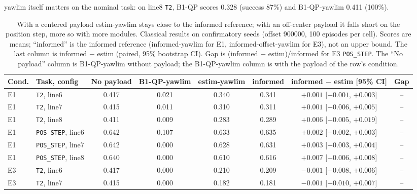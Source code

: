 \documentclass[conference]{IEEEtran}
\newcommand{\POS}{\texttt{POS\_STEP}}
\newcommand{\TT}{\texttt{T2}}
\begin{document}
yawlim itself matters on the nominal task: on line8 \TT, B1-QP scores 0.328 (success 87\%) and B1-QP-yawlim 0.411 (100\%). %

\begin{table}[t]
\caption{With a centered payload estim-yawlim stays close to the informed reference; with an off-center payload it falls short on the position step, more so with more modules. Classical results on confirmatory seeds (offset 900000, 100 episodes per cell). Scores are means; ``informed'' is the informed reference (informed-yawlim for E1, informed-offset-yawlim for E3), not an upper bound. The last column is informed $-$ estim (paired, 95\% bootstrap CI). Gap is (informed $-$ estim)/informed for E3 \POS. The ``No payload'' column is B1-QP-yawlim without payload; the B1-QP-yawlim column is with the payload of the row's condition.}\label{tab:classical} %
\centering\small
\begin{tabular}{@{}llcccccc@{}}
\toprule
Cond. & Task, config & No payload & B1-QP-yawlim & estim-yawlim & informed & informed $-$ estim [95\% CI] & Gap \\
\midrule
E1 & \TT, line6 & 0.417 & 0.021 & 0.340 & 0.341 & $+0.001$ [$-0.001$, $+0.003$] & -- \\ %
E1 & \TT, line7 & 0.415 & 0.011 & 0.310 & 0.311 & $+0.001$ [$-0.006$, $+0.005$] & -- \\ %
E1 & \TT, line8 & 0.411 & 0.009 & 0.283 & 0.289 & $+0.006$ [$-0.005$, $+0.019$] & -- \\ %
E1 & \POS, line6 & 0.642 & 0.107 & 0.633 & 0.635 & $+0.002$ [$+0.002$, $+0.003$] & -- \\ %
E1 & \POS, line7 & 0.642 & 0.000 & 0.628 & 0.631 & $+0.003$ [$+0.003$, $+0.004$] & -- \\ %
E1 & \POS, line8 & 0.640 & 0.000 & 0.610 & 0.616 & $+0.007$ [$+0.006$, $+0.008$] & -- \\ %
\midrule
E3 & \TT, line6 & 0.417 & 0.000 & 0.210 & 0.209 & $-0.001$ [$-0.008$, $+0.006$] & -- \\ %
E3 & \TT, line7 & 0.415 & 0.000 & 0.182 & 0.181 & $-0.001$ [$-0.010$, $+0.007$] & -- \\ %

\end{tabular}
\end{table}
\end{document}
